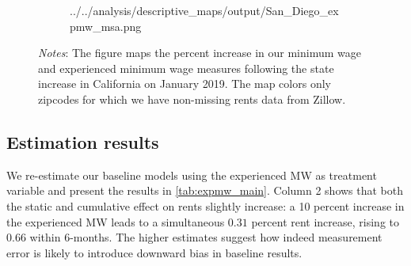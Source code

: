 \begin{figure}
\begin{subfigure}[b]{0.55\textwidth}
		{../../analysis/descriptive_maps/output/San_Diego_expmw_msa.png}
	\end{subfigure}
	\begin{minipage}{0.95\textwidth} \footnotesize
		\vspace{2mm} 
		\textit{Notes}: The figure maps the percent increase in our minimum wage and 
		experienced minimum wage measures following the state increase in California
		on January 2019. The map colors only zipcodes for which we have non-missing 
		rents data from Zillow.
	\end{minipage}
\end{figure}


\subsection{Estimation results}

We re-estimate our baseline models using the experienced MW as treatment variable and present 
the results in \autoref{tab:expmw_main}. Column 2 shows that both the static and cumulative 
effect on rents slightly increase: a 10 percent increase in the experienced MW leads to a simultaneous
$0.31$ percent rent increase, rising to $0.66$ within 6-months. The higher estimates suggest how 
indeed measurement error is likely to introduce downward bias in baseline results.



